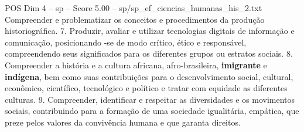 \begin{textsample}{POS Dim 4 – sp – Score 5.00 – sp/sp\_ef\_ciencias\_humanas\_his\_2.txt}
Compreender e problematizar os conceitos e procedimentos da produção historiográfica. 7.
Produzir, avaliar e utilizar tecnologias digitais de informação e comunicação, posicionando -se de modo crítico, ético e responsável, compreendendo seus significados para os diferentes grupos ou estratos sociais. 8.
Compreender a história e a cultura africana, afro-brasileira, \textbf{imigrante} e \textbf{indígena}, bem como suas contribuições para o desenvolvimento social, cultural, econômico, científico, tecnológico e político e tratar com equidade as diferentes culturas. 9.
Compreender, identificar e respeitar as diversidades e os movimentos sociais, contribuindo para a formação de uma sociedade igualitária, empática, que preze pelos valores da convivência humana e que garanta direitos.

\end{textsample}
